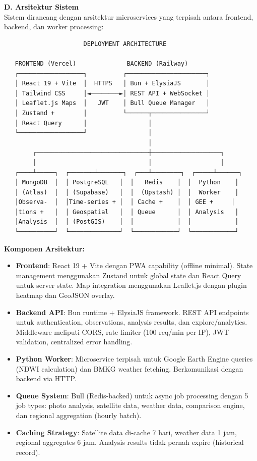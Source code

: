 \documentclass[12pt,a4paper]{article}
\newcommand{\subsectionbox}[1]{%
  \textbf{\large #1}\\[0.3cm]
}
\begin{document}
\subsectionbox{D. Arsitektur Sistem}

Sistem dirancang dengan arsitektur microservices yang terpisah antara frontend, backend, dan worker processing:

\begin{verbatim}
                      DEPLOYMENT ARCHITECTURE
                                            
   FRONTEND (Vercel)              BACKEND (Railway)
   ┌──────────────────┐          ┌──────────────────────┐
   │ React 19 + Vite  │  HTTPS   │ Bun + ElysiaJS       │
   │ Tailwind CSS     │◄────────►│ REST API + WebSocket │
   │ Leaflet.js Maps  │   JWT    │ Bull Queue Manager   │
   │ Zustand +        │          └──────┬───────────────┘
   │ React Query      │                 │
   └──────────────────┘                 │
                                        │
        ┌───────────────────────────────┼───────────────────┐
        │                               │                   │
   ┌────┴─────┐  ┌───────┴───────┐  ┌───┴────────┐  ┌─────┴──────┐
   │ MongoDB  │  │ PostgreSQL   │  │   Redis    │  │  Python    │
   │ (Atlas)  │  │ (Supabase)   │  │  (Upstash) │  │  Worker    │
   │Observa-  │  │Time-series + │  │ Cache +    │  │ GEE +     │
   │tions +   │  │ Geospatial   │  │ Queue      │  │ Analysis   │
   │Analysis  │  │ (PostGIS)    │  │            │  │            │
   └──────────┘  └──────────────┘  └────────────┘  └────────────┘
\end{verbatim}

\textbf{Komponen Arsitektur:}

\begin{itemize}
  \item \textbf{Frontend}: React 19 + Vite dengan PWA capability (offline minimal). State management menggunakan Zustand untuk global state dan React Query untuk server state. Map integration menggunakan Leaflet.js dengan plugin heatmap dan GeoJSON overlay.
  \item \textbf{Backend API}: Bun runtime + ElysiaJS framework. REST API endpoints untuk authentication, observations, analysis results, dan explore/analytics. Middleware meliputi CORS, rate limiter (100 req/min per IP), JWT validation, centralized error handling.
  \item \textbf{Python Worker}: Microservice terpisah untuk Google Earth Engine queries (NDWI calculation) dan BMKG weather fetching. Berkomunikasi dengan backend via HTTP.
  \item \textbf{Queue System}: Bull (Redis-backed) untuk async job processing dengan 5 job types: photo analysis, satellite data, weather data, comparison engine, dan regional aggregation (hourly batch).
  \item \textbf{Caching Strategy}: Satellite data di-cache 7 hari, weather data 1 jam, regional aggregates 6 jam. Analysis results tidak pernah expire (historical record).
\end{itemize}
\end{document}
